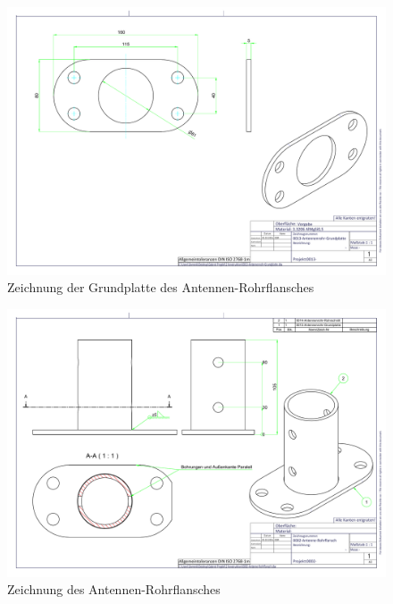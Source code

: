 \begin{figure}[h!]
	\includegraphics[angle=90,width=\textwidth]{../ref/0013-Antennenrohr-Grundplatte.pdf}
	\caption{Zeichnung der Grundplatte des Antennen-Rohrflansches}
	\label{fig:Grundplattelatte-Rohrflansch-Antenne}
\end{figure}

\begin{figure}[h!]
	\includegraphics[angle=90,width=\textwidth]{../ref/0002-Antenne-Rohrflansch.pdf}
	\caption{Zeichnung des Antennen-Rohrflansches}
	\label{fig:Rohrflansch-Antenne}
\end{figure}

